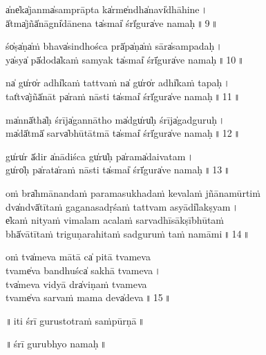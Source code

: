 \documentclass[parskip, DIV=14]{scrartcl}
\begin{document}
a̍ne̍ka̍janma̍samprā॒pta ka̍rme̍ndha̍navi̍dhāhi॒ne॒\,। \\
ā̍tma̍jñā̍nāgni̍dāne॒na  ta̍smai̍ śrī̍gura̍ve na॒ma॒ḥ॒\,॥\,9\,॥ \par 

śo̍ṣa̍ṇa̍ṁ bhava̍sindho॒śca prā̍pa̍ṇa̍ṁ sāra̍sampa॒da॒ḥ\,। \\
ya̍sya̍ pā̍doda̍kaṁ sa॒myak  ta̍smai̍ śrī̍gura̍ve na॒ma॒ḥ॒\,॥\,10\,॥ \par 

na̍ gu̍ro̍r adhi̍kaṁ ta॒ttvaṁ na̍ gu̍ro̍r adhi̍kaṁ ta॒pa॒ḥ\,। \\
tat̍tva̍jñā̍nāt pa̍raṁ nā॒sti ta̍smai̍ śrī̍gura̍ve na॒ma॒ḥ॒\,॥\,11\,॥ \par 

ma̍nnā̍tha̍ḥ śrīja̍gannā॒tho ma̍dgu̍ru̍ḥ śrīja̍gadgu॒ru॒ḥ॒\,। \\
ma̍dā̍tmā̍ sarva̍bhūtā॒tmā  ta̍smai̍ śrī̍gura̍ve na॒ma॒ḥ॒\,॥\,12\,॥ \par 

gu̍ru̍r ā̍dir a̍nādi॒śca gu̍ru̍ḥ pa̍rama̍daiva॒ta॒m\,। \\
gu̍ro̍ḥ pa̍rata̍raṁ nā॒sti   ta̍smai̍ śrī̍gura̍ve na॒ma॒ḥ॒\,॥\,13\,॥ \par 

\vspace{1cm}

oṁ bra̍hmānandaṁ paramasukhadaṁ ke॒va॒laṁ jñā॒namū॒rtiṁ  \\
dva̍ndvā̍tītaṁ gaganasadṛśaṁ ta॒ttvam a॒syādi̍lakṣya॒m\,। \\
e̍kaṁ nityaṁ vimalam acalaṁ sa॒rvadhī॒sākṣībhū॒taṁ  \\
bhā̍vātītaṁ triguṇarahitaṁ sa॒dguruṁ taṁ na॒māmi॒\,॥\,14\,॥ \par

\vspace{1cm}

oṁ tva̍meva mātā ca̍ pi॒tā tvame॒va \\
tva॒me̍va bandhuśca̍ sa॒khā tvameva॒\,। \\ 
tva̍meva vidyā dra̍vi॒ṇaṁ tvame॒va \\
tva॒me̍va sarvaṁ ma॒ma॒ deva̍deva॒\,॥\,15\,॥ \par 

\vspace{1cm}
 
\begin{center}
 ॥\,iti śrī gu॒rustotraṁ saṁpū॒rṇā\,॥

\vspace{1cm}

॥\,śrī gu॒ru॒bhyo na॒ma॒ḥ॒\,॥

\end{center}
\end{document}

